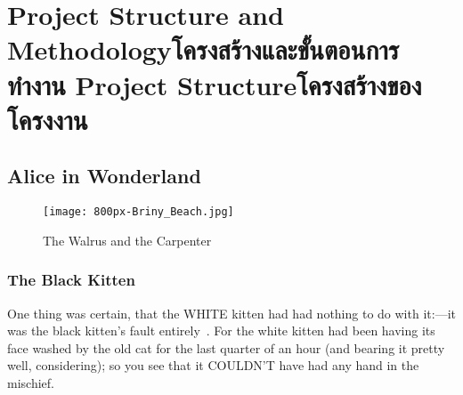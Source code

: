 \chapter{\ifproject%
\ifenglish Project Structure and Methodology\else โครงสร้างและขั้นตอนการทำงาน\fi
\else%
\ifenglish Project Structure\else โครงสร้างของโครงงาน\fi
\fi
}


\makeatletter


\makeatother

\section{Alice in Wonderland}

\begin{figure}
\begin{center}
\texttt{[image: 800px-Briny\_Beach.jpg]}
\end{center}
\caption[Poem]{The Walrus and the Carpenter}
\label{fig:walrus}
\end{figure}

\subsection{The Black Kitten}
  One thing was certain, that the WHITE kitten had had nothing to
do with it:---it was the black kitten's fault entirely~\cite{aiw}.  For the
white kitten had been having its face washed by the old cat for
the last quarter of an hour (and bearing it pretty well,
considering); so you see that it COULDN'T have had any hand in
the mischief.

